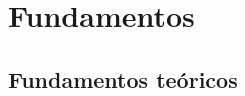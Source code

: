 \chapter{Fundamentos}
\label{chap:fundamentos}



\section{Fundamentos teóricos}
\label{sec:fundamentos_teoricos}




